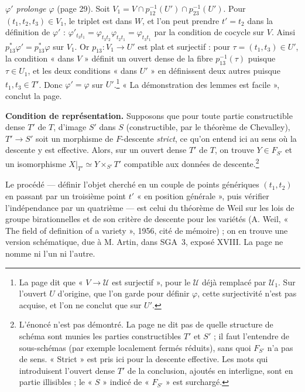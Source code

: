\documentclass[11pt,a4paper]{article}
\begin{document}
\emph{$\varphi'$ prolonge $\varphi$} (page 29). Soit $V_1 = V \cap
p_{12}^{-1}(U') \cap p_{23}^{-1}(U')$. Pour $(t_1, t_2, t_3) \in V_1$, le
triplet est dans $W$, et l'on peut prendre $t' = t_2$ dans la définition de
$\varphi'$ : $\varphi'_{t_3 t_1} = \varphi_{t_3 t_2}\varphi_{t_2 t_1} =
\varphi_{t_3 t_1}$ par la condition de cocycle sur $V$. Ainsi
$p_{13}^{*}\varphi' = p_{13}^{*}\varphi$ sur $V_1$. Or $p_{13} : V_1 \to U'$
est plat et surjectif : pour $\tau = (t_1, t_3) \in U'$, la condition « dans
$V$ » définit un ouvert dense de la fibre $p_{13}^{-1}(\tau)$ puisque $\tau \in
U_1$, et les deux conditions « dans $U'$ » en définissent deux autres puisque
$t_1, t_3 \in T'$. Donc $\varphi' = \varphi$ sur $U'$.\footnote{La page dit que
« $V \to \mathcal{U}$ est surjectif », pour le $\mathcal{U}$ déjà remplacé par
$\mathcal{U}_1$. Sur l'ouvert $U$ d'origine, que l'on garde pour définir
$\varphi$, cette surjectivité n'est pas acquise, et l'on ne conclut que sur
$U'$.} « La démonstration des lemmes est facile », conclut la page.

\textbf{Condition de représentation.} Supposons que pour toute partie
constructible dense $T'$ de $T$, d'image $S'$ dans $S$ (constructible, par le
théorème de Chevalley), $T' \to S'$ soit un morphisme de $F$-descente
\emph{strict}, ce qu'on entend ici au sens où la descente y est effective. Alors, sur un ouvert dense $T'$ de
$T$, on trouve $Y \in F_{S'}$ et un isomorphisme $X|_{T'} \simeq Y \times_{S'}
T'$ compatible aux données de descente.\footnote{L'énoncé n'est pas démontré.
La page ne dit pas de quelle structure de schéma sont munies les parties
constructibles $T'$ et $S'$ ; il faut l'entendre de sous-schémas (par exemple
localement fermés réduits), sans quoi $F_{S'}$ n'a pas de sens. « Strict » est
pris ici pour la descente effective. Les mots qui
introduisent l'ouvert dense $T'$ de la conclusion, ajoutés en interligne,
sont en partie illisibles ; le « $S$ » indicé de « $F_{S'}$ » est surchargé.}

Le procédé — définir l'objet cherché en un couple de points génériques
$(t_1, t_2)$ en passant par un troisième point $t'$ « en position générale »,
puis vérifier l'indépendance par un quatrième — est celui du théorème de Weil
sur les lois de groupe birationnelles et de son critère de descente pour les
variétés (A. Weil, « The field of definition of a variety », 1956, cité de
mémoire) ; on en trouve une version schématique, due à M. Artin, dans SGA~3,
exposé XVIII. La page ne nomme ni l'un ni l'autre.

\end{document}
